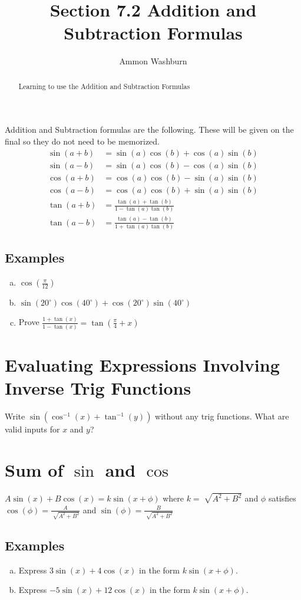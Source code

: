 \documentclass{tufte-handout}
\title{Section 7.2 Addition and Subtraction Formulas}
\author[AW]{Ammon Washburn}
\begin{document}
\maketitle

\begin{abstract}
Learning to use the Addition and Subtraction Formulas
\end{abstract}
Addition and Subtraction formulas are the following.  These will be given on the final so they do not need to be memorized.
\begin{align*}
\sin(a + b) & = \sin(a)\cos(b) + \cos(a)\sin(b) \\
\sin(a - b) & = \sin(a) \cos(b) - \cos(a) \sin(b) \\
\cos(a + b) & = \cos(a)\cos(b) - \sin(a)\sin(b) \\
\cos(a - b) & = \cos(a)\cos(b) + \sin(a)\sin(b) \\
\tan(a + b) & = \frac{\tan(a) + \tan(b)}{1-\tan(a)\tan(b)} \\
\tan(a - b) & = \frac{\tan(a) - \tan(b)}{1 + \tan(a)\tan(b)}
\end{align*}

\subsection{Examples}
\begin{enumerate}[(a)]
\item $\cos(\frac{\pi}{12})$
\item $\sin(20^{\circ})\cos(40^{\circ}) + \cos(20^{\circ})\sin(40^{\circ})$
\item Prove $\frac{1+ \tan(x)}{1-\tan(x)}=\tan(\frac{\pi}{4} + x)$
\end{enumerate}

\section{Evaluating Expressions Involving Inverse Trig Functions}
Write $\sin(\cos^{-1}(x) + \tan^{-1}(y))$ without any trig functions.  What are valid inputs for $x$ and $y$?

\section{Sum of $\sin$ and $\cos$}
$A\sin(x) + B \cos(x) = k \sin(x + \phi)$ where $k=\sqrt[]{A^2+B^2}$ and $\phi$ satisfies $\cos(\phi) = \frac{A}{\sqrt[]{A^2 + B^2}}$ and $\sin(\phi) = \frac{B}{\sqrt[]{A^2 + B^2}}$

\subsection{Examples}
\begin{enumerate}[(a)]
\item Express $3\sin(x) + 4\cos(x)$ in the form $k\sin(x+\phi)$.
\item Express $-5\sin(x) + 12 \cos(x)$ in the form $k\sin(x + \phi)$.
\end{enumerate}
\end{document}
